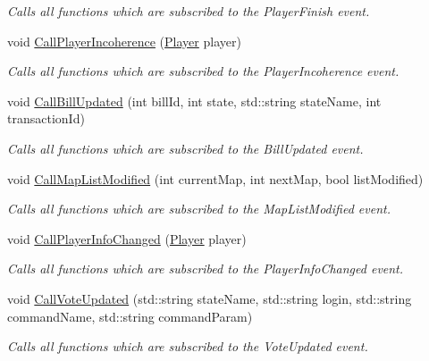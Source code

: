 \begin{DoxyCompactItemize}
\begin{DoxyCompactList}\small\item\em Calls all functions which are subscribed to the Player\-Finish event. \end{DoxyCompactList}\item 
void \hyperlink{classEventManager_afdd5ead369a6440a6419e0d5269af5bc}{Call\-Player\-Incoherence} (\hyperlink{structPlayer}{Player} player)
\begin{DoxyCompactList}\small\item\em Calls all functions which are subscribed to the Player\-Incoherence event. \end{DoxyCompactList}\item 
void \hyperlink{classEventManager_aee53ab1e28714b9cbcd381b23efae623}{Call\-Bill\-Updated} (int bill\-Id, int state, std\-::string state\-Name, int transaction\-Id)
\begin{DoxyCompactList}\small\item\em Calls all functions which are subscribed to the Bill\-Updated event. \end{DoxyCompactList}\item 
void \hyperlink{classEventManager_a992d53782e7aacc561ff5348f7905b1b}{Call\-Map\-List\-Modified} (int current\-Map, int next\-Map, bool list\-Modified)
\begin{DoxyCompactList}\small\item\em Calls all functions which are subscribed to the Map\-List\-Modified event. \end{DoxyCompactList}\item 
void \hyperlink{classEventManager_a1673fa8c0a40a910cb3ed800e1a2fc11}{Call\-Player\-Info\-Changed} (\hyperlink{structPlayer}{Player} player)
\begin{DoxyCompactList}\small\item\em Calls all functions which are subscribed to the Player\-Info\-Changed event. \end{DoxyCompactList}\item 
void \hyperlink{classEventManager_ad9907c7d0fd7a93e336e4a99db008540}{Call\-Vote\-Updated} (std\-::string state\-Name, std\-::string login, std\-::string command\-Name, std\-::string command\-Param)
\begin{DoxyCompactList}\small\item\em Calls all functions which are subscribed to the Vote\-Updated event. \end{DoxyCompactList}\end{DoxyCompactItemize}
